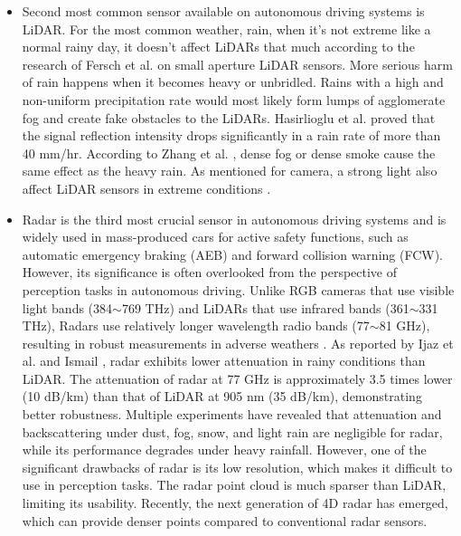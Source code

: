\documentclass[rnd]{mas_proposal}
\begin{document}
\begin{itemize}
    \item Second most common sensor available on autonomous driving systems is LiDAR. For the most common weather, rain, when it’s not extreme like a normal rainy day, it doesn’t affect LiDARs that much according to the research of Fersch et al. \cite{fersch2016influence} on small aperture LiDAR sensors. More serious harm of rain happens when it becomes heavy or unbridled. Rains with a high and non-uniform precipitation rate would most likely form lumps of agglomerate fog and create fake obstacles to the LiDARs. Hasirlioglu et al. \cite{hasirlioglu2016modeling} proved that the signal reflection intensity drops significantly in a rain rate of more than 40 mm/hr. According to Zhang et al. \cite{Zhang2021Dec}, dense fog or dense smoke cause the same effect as the heavy rain. As mentioned for camera, a strong light also affect LiDAR sensors in extreme conditions \cite{acarballo2020libre}.


    \item Radar is the third most crucial sensor in autonomous driving systems and is widely used in mass-produced cars for active safety functions, such as automatic emergency braking (AEB) and forward collision warning (FCW). However, its significance is often overlooked from the perspective of perception tasks in autonomous driving. Unlike RGB cameras that use visible light bands (384$\sim$769 THz) and LiDARs that use infrared bands (361$\sim$331 THz), Radars use relatively longer wavelength radio bands (77$\sim$81 GHz), resulting in robust measurements in adverse weathers \cite{Paek2022Jun}. As reported by Ijaz et al. \cite{ijaz2012analysis} and Ismail \cite{gultepe2008measurements}, radar exhibits lower attenuation in rainy conditions than LiDAR. The attenuation of radar at 77 GHz is approximately 3.5 times lower (10 dB/km) than that of LiDAR at 905 nm (35 dB/km), demonstrating better robustness. Multiple experiments \cite{adams2012robotic, brooker2007seeing, xu2022learned, gourova2017analysis, zang2019impact} have revealed that attenuation and backscattering under dust, fog, snow, and light rain are negligible for radar, while its performance degrades under heavy rainfall. However, one of the significant drawbacks of radar is its low resolution, which makes it difficult to use in perception tasks. The radar point cloud is much sparser than LiDAR, limiting its usability. Recently, the next generation of 4D radar has emerged, which can provide denser points compared to conventional radar sensors.


\end{itemize}
\end{document}
